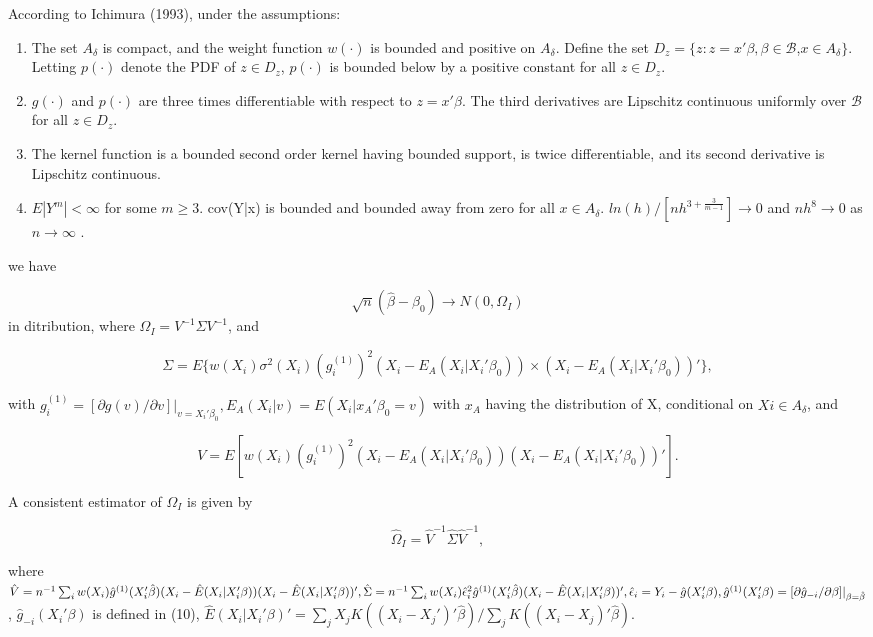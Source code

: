 \documentclass[a4paper]{article}
\begin{document}
\begin{theorem}
According to Ichimura (1993), under the assumptions:

\begin{enumerate}
	\item The set $A_\delta$ is compact, and the weight function $w(\cdot)$ is bounded and positive on $A_\delta$. Define the set $D_z = \{ z : z = x'\beta, \beta \in \mathcal{B}$,$ x \in A_\delta\}$. Letting $p(\cdot)$ denote the PDF of $z \in D_z$, $p(\cdot)$ is bounded below by a positive constant for all $z \in D_z$.
	\item $g(\cdot)$ and $p(\cdot)$ are three times differentiable with respect to $z = x'\beta$. The third derivatives are Lipschitz continuous uniformly over $\mathcal{B}$ for all $z \in D_z$.
	\item The kernel function is a bounded second order kernel having bounded support, is twice differentiable, and its second derivative is Lipschitz continuous.
	\item $E|Y^m| < \infty$ for some $m \geq 3$. cov(Y|x) is bounded and bounded away from zero for all $x \in A_\delta$. $ln(h)/[nh^{3 + \frac{3}{m-1}}] \rightarrow 0$ and $nh^8 \rightarrow 0$ as $n \rightarrow \infty $ .
	
\end{enumerate}

we have

\[ \sqrt{n}(\hat{\beta} - \beta_0) \rightarrow N(0,\Omega_I) \] in ditribution, where $\Omega_I = V^{-1}\Sigma V^{-1}$, and

\[\Sigma = E\{w(X_i)\sigma^2(X_i)(g_i^{(1)})^2(X_i - E_A(X_i|X_i'\beta_0)) \times (X_i - E_A(X_i|X_i'\beta_0))'\},\]

with $g_i^{(1)} = [\partial g(v)/\partial v]|_{v = X_i'\beta_0}, E_A(X_i|v) = E(X_i|x_A'\beta_0 = v)$ with $x_A$ having the distribution of X, conditional on $Xi \in A_\delta$, and

\[ V = E[w(X_i)(g_i^{(1)})^2(X_i - E_A(X_i|X_i'\beta_0))(X_i - E_A(X_i|X_i'\beta_0))'].\]

\end{theorem}


A consistent estimator of $\Omega_I$ is given by

\[ \hat{\Omega}_I = \hat{V}^{-1}\hat{\Sigma}\hat{V}^{-1}, \]

where $\hat{V} = n^{-1}\sum_{i} w(X_i)\hat{g}^{(1)}(X_i'\hat{\beta})(X_i - \hat{E}(X_i|X_i'\beta))(X_i - \hat{E}(X_i|X_i'\beta))', \hat{\Sigma} = n^{-1}\sum_{i} w(X_i)\hat{\epsilon}_{i}^{2}\hat{g}^{(1)}(X_i'\hat{\beta})(X_i - \hat{E}(X_i|X_i'\beta))', \hat{\epsilon}_i = Y_i - \hat{g}(X_i'\beta), \hat{g}^{(1)}(X_i'\beta) \linebreak
= [\partial \hat{g}_{-i}/\partial \beta]|_{\beta=\hat{\beta}}$, $\hat{g}_{-i}(X_i'\beta)$ is defined in (10), $\hat{E}(X_i|X_i'\beta)' = \sum_{j} X_jK((X_i - X_j')'\hat{\beta})/ \sum_{j}K((X_i - X_j)'\hat{\beta}).$
\end{document}
